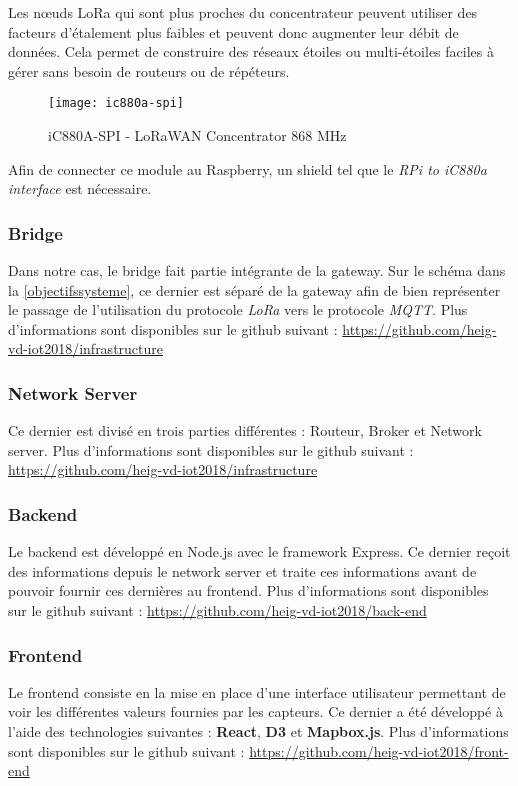 Les nœuds LoRa qui sont plus proches du concentrateur peuvent utiliser des facteurs d'étalement plus faibles et peuvent donc augmenter leur débit de données. Cela permet de construire des réseaux étoiles ou multi-étoiles faciles à gérer sans besoin de routeurs ou de répéteurs.

\begin{figure}[!h]
	\centering
	\texttt{[image: ic880a-spi]}
	\caption{iC880A-SPI - LoRaWAN Concentrator 868 MHz}
	\label{}
\end{figure}

Afin de connecter ce module au Raspberry, un shield tel que le \textit{RPi to iC880a interface} est nécessaire.

\newpage

\subsubsection{Bridge}

Dans notre cas, le bridge fait partie intégrante de la gateway. Sur le schéma dans la \autoref{objectifssysteme}, ce dernier est séparé de la gateway afin de bien représenter le passage de l'utilisation du protocole \textit{LoRa} vers le protocole \textit{MQTT}.
Plus d'informations sont disponibles sur le github suivant : \url{https://github.com/heig-vd-iot2018/infrastructure}

\subsubsection{Network Server}

Ce dernier est divisé en trois parties différentes : Routeur, Broker et Network server.
Plus d'informations sont disponibles sur le github suivant : \url{https://github.com/heig-vd-iot2018/infrastructure}
\subsubsection{Backend}

Le backend est développé en Node.js avec le framework Express. Ce dernier reçoit des informations depuis le network server et traite ces informations avant de pouvoir fournir ces dernières au frontend.
Plus d'informations sont disponibles sur le github suivant : \url{https://github.com/heig-vd-iot2018/back-end}

\subsubsection{Frontend}
Le frontend consiste en la mise en place d'une interface utilisateur permettant de voir les différentes valeurs fournies par les capteurs. Ce dernier a été développé à l'aide des technologies suivantes : \textbf{React}, \textbf{D3} et \textbf{Mapbox.js}.
Plus d'informations sont disponibles sur le github suivant : \url{https://github.com/heig-vd-iot2018/front-end}

